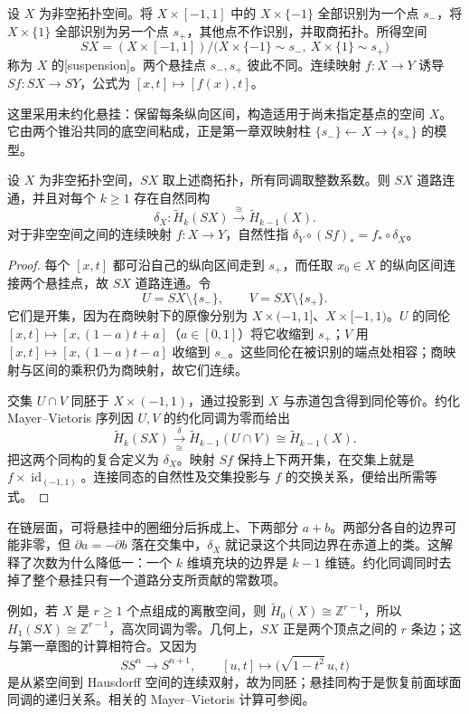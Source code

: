 \begin{definition}[悬挂]\label{g2:def:unreduced-suspension}
	设 \(X\) 为非空拓扑空间。将 \(X\times[-1,1]\) 中的 \(X\times\{-1\}\) 全部识别为一个点 \(s_-\)，将 \(X\times\{1\}\) 全部识别为另一个点 \(s_+\)，其他点不作识别，并取商拓扑。所得空间
	\[
		SX=(X\times[-1,1])/
		\bigl(X\times\{-1\}\sim s_-,\ X\times\{1\}\sim s_+\bigr)
	\]
	称为 \(X\) 的[suspension]。两个悬挂点 \(s_-,s_+\) 彼此不同。连续映射 \(f:X\to Y\) 诱导 \(Sf:SX\to SY\)，公式为 \([x,t]\mapsto[f(x),t]\)。
\end{definition}

这里采用未约化悬挂：保留每条纵向区间，构造适用于尚未指定基点的空间 \(X\)。它由两个锥沿共同的底空间粘成，正是第一章双映射柱 \(\{s_-\}\leftarrow X\to\{s_+\}\) 的模型。

\begin{theorem}[悬挂同构]\label{g2:thm:suspension-homology}
	设 \(X\) 为非空拓扑空间，\(SX\) 取上述商拓扑，所有同调取整数系数。则 \(SX\) 道路连通，并且对每个 \(k\ge1\) 存在自然同构
	\[
		\delta_X:\widetilde H_k(SX)\xrightarrow{\cong}
		\widetilde H_{k-1}(X).
	\]
	对于非空空间之间的连续映射 \(f:X\to Y\)，自然性指
	\(\delta_Y\circ(Sf)_*=f_*\circ\delta_X\)。
\end{theorem}
\begin{proof}
	每个 \([x,t]\) 都可沿自己的纵向区间走到 \(s_+\)，而任取 \(x_0\in X\) 的纵向区间连接两个悬挂点，故 \(SX\) 道路连通。令
	\[
		U=SX\setminus\{s_-\},\qquad V=SX\setminus\{s_+\}.
	\]
	它们是开集，因为在商映射下的原像分别为 \(X\times(-1,1]\)、\(X\times[-1,1)\)。\(U\) 的同伦 \([x,t]\mapsto[x,(1-a)t+a]\)（\(a\in[0,1]\)）将它收缩到 \(s_+\)；\(V\) 用 \([x,t]\mapsto[x,(1-a)t-a]\) 收缩到 \(s_-\)。这些同伦在被识别的端点处相容；商映射与区间的乘积仍为商映射，故它们连续。

	交集 \(U\cap V\) 同胚于 \(X\times(-1,1)\)，通过投影到 \(X\) 与赤道包含得到同伦等价。约化 Mayer–Vietoris 序列因 \(U,V\) 的约化同调为零而给出
	\[
		\widetilde H_k(SX)\xrightarrow[\cong]{\delta}
		\widetilde H_{k-1}(U\cap V)
		\cong\widetilde H_{k-1}(X).
	\]
	把这两个同构的复合定义为 \(\delta_X\)。映射 \(Sf\) 保持上下两开集，在交集上就是 \(f\times\operatorname{id}_{(-1,1)}\)。连接同态的自然性及交集投影与 \(f\) 的交换关系，便给出所需等式。
\end{proof}

在链层面，可将悬挂中的圈细分后拆成上、下两部分 \(a+b\)。两部分各自的边界可能非零，但 \(\partial a=-\partial b\) 落在交集中，\(\delta_X\) 就记录这个共同边界在赤道上的类。这解释了次数为什么降低一：一个 \(k\) 维填充块的边界是 \(k-1\) 维链。约化同调同时去掉了整个悬挂只有一个道路分支所贡献的常数项。

\ProseParagraphBreak

例如，若 \(X\) 是 \(r\ge1\) 个点组成的离散空间，则 \(\widetilde H_0(X)\cong\mathbb Z^{r-1}\)，所以 \(H_1(SX)\cong\mathbb Z^{r-1}\)，高次同调为零。几何上，\(SX\) 正是两个顶点之间的 \(r\) 条边；这与第一章图的计算相符合。又因为
\[
	SS^n\longrightarrow S^{n+1},\qquad
	[u,t]\longmapsto\bigl(\sqrt{1-t^2}\,u,t\bigr)
\]
是从紧空间到 Hausdorff 空间的连续双射，故为同胚；悬挂同构于是恢复前面球面同调的递归关系。相关的 Mayer–Vietoris 计算可参阅\cite[第2.2节]{Hatcher2002}。
